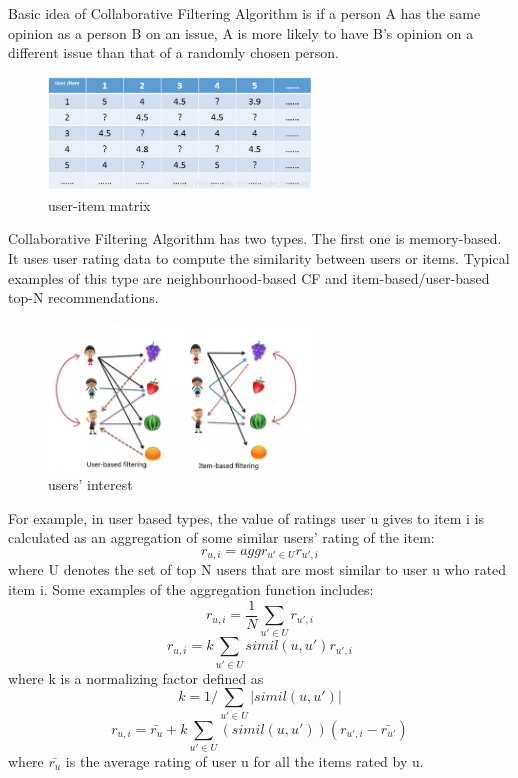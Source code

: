 \documentclass{acmtog} %
\begin{document}
Basic idea of Collaborative Filtering Algorithm is if a person A has the same opinion as a person B on an issue, A is more likely to have B's opinion on a different issue than that of a randomly chosen person.

\begin{figure}[h]
\centerline{\includegraphics[width=7cm]{uesr_item.jpg}}
\caption{user-item matrix}
\end{figure}

Collaborative Filtering Algorithm has two types. The first one is memory-based. It uses user rating data to compute the similarity between users or items. Typical examples of this type are neighbourhood-based CF and item-based/user-based top-N recommendations. 
\begin{figure}[h]
\centerline{\includegraphics[width=7cm]{user_and_item.png}}
\caption{users' interest}
\end{figure}

For example, in user based types, the value of ratings user u gives to item i is calculated as an aggregation of some similar users' rating of the item:
\begin{equation}
r_{u,i}=aggr_{u'\in U}r_{u',i}
\end{equation}
where U denotes the set of top N users that are most similar to user u who rated item i. Some examples of the aggregation function includes:
\begin{equation}
r_{u,i}=\frac{1}{N}\sum_{u'\in U} r_{u',i}
\end{equation}
\begin{equation}
r_{u,i}=k\sum_{u'\in U}simil(u,u') r_{u',i}
\end{equation}
where k is a normalizing factor defined as
\begin{equation}
k=1/\sum_{u'\in U}|simil(u,u')|
\end{equation}
\begin{equation}
r_{u,i}=\bar{r_u}+k\sum_{u'\in U}(simil(u,u'))(r_{u',i}-\bar{r_{u'}})
\end{equation}
where $\bar{r_{u}}$ is the average rating of user u for all the items rated by u.
\end{document}
